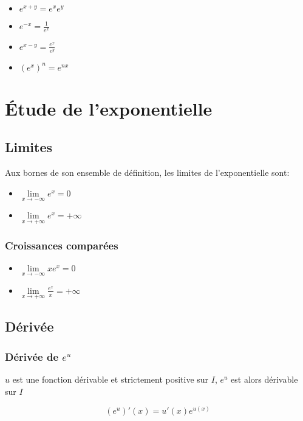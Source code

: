 \documentclass[a4paper]{article}
\begin{document}
\begin{multicols}{4}
	\begin{itemize}
		\item{$e^{x+y}=e^x e^y$}
		\item{$e^{-x}=\frac{1}{e^x}$}
		\item{$e^{x-y}=\frac{e^x}{e^y}$}
		\item{$(e^{x})^n=e^{nx}$}
	\end{itemize}
\end{multicols}

\section{Étude de l'exponentielle}
\subsection{Limites}

{Aux bornes de son ensemble de définition, les limites de l'exponentielle sont:}

\begin{multicols}{2}
	\begin{itemize}
  		\item{$\lim\limits_{x \rightarrow -\infty} e^x=0$}
  		\item{$\lim\limits_{x \rightarrow +\infty} e^x=+\infty$}
	\end{itemize}
\end{multicols}

\subsubsection{Croissances comparées}

\begin{multicols}{2}
	\begin{itemize}
  		\item{$\lim\limits_{x \rightarrow -\infty} xe^x=0$}
  		\item{$\lim\limits_{x \rightarrow +\infty} \frac{e^x}{x}=+\infty$}
	\end{itemize}
\end{multicols}

\subsection{Dérivée}
\subsubsection{Dérivée de $e^u$}

{$u$ est une fonction dérivable et strictement positive sur $I$, $e^u$ est alors dérivable sur $I$}

\[(e^u)\prime(x)=u\prime(x)e^{u(x)}\]
\end{document}
